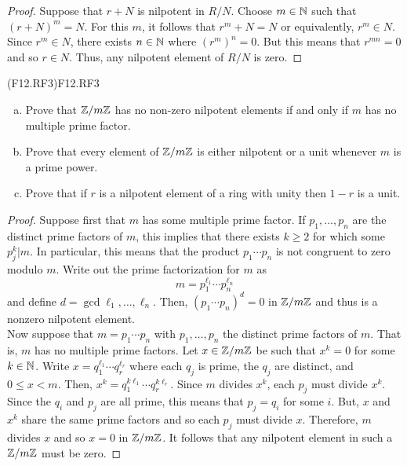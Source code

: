 \documentclass[../AlgebraQualSolutions.tex]{subfiles}
\begin{document}
\begin{proof}
	Suppose that $r + N$ is nilpotent in $R/N$. Choose $m \in \mathbb{N}$ such that $(r + N)^m = N$. For this $m$, it follows that $r^m + N = N$ or equivalently, $r^m \in N$. Since $r^m \in N$, there exists $n \in \mathbb{N}$ where $(r^m)^n = 0$. But this means that $r^{mn} = 0$ and so $r \in N$. Thus, any nilpotent element of $R/N$ is zero.
\end{proof}

\begin{prob}{(F12.RF3)}{F12.RF3}
\begin{enumerate}[(a)]
\item Prove that $\mathbb{Z}/m\mathbb{Z}$ has no non-zero nilpotent elements if and only if $m$ has no multiple prime factor.
\item Prove that every element of $\mathbb{Z}/m\mathbb{Z}$ is either nilpotent or a unit whenever $m$ is a prime power.
\item Prove that if $r$ is a nilpotent element of a ring with unity then $1-r$ is a unit.
\end{enumerate}
\end{prob}

\begin{proof}
    Suppose first that $m$ has some multiple prime factor. If $p_1,\ldots, p_n$ are the distinct prime factors of $m$, this implies that there exists $k \geq 2$ for which some $p_j^k | m$. In particular, this means that the product $p_1 \cdots p_n$ is not congruent to zero modulo $m$. Write out the prime factorization for $m$ as 
		\[m = p_1^{\ell_1} \cdots p_n^{\ell_n}\]
	and define $d = \gcd{\ell_1,\ldots, \ell_n}$. Then, $(p_1\cdots p_n)^d = 0$ in $\mathbb{Z}/m\mathbb{Z}$ and thus is a nonzero nilpotent element.\\

	Now suppose that $m = p_1 \cdots p_n$ with $p_1,\ldots, p_n$ the distinct prime factors of $m$. That is, $m$ has no multiple prime factors. Let $x \in \mathbb{Z}/m\mathbb{Z}$ be such that $x^k = 0$ for some $k \in \mathbb{N}$. Write $x = q_1^{\ell_1} \cdots q_r^{\ell_r}$ where each $q_j$ is prime, the $q_j$ are distinct, and $0 \leq x < m$. Then, $x^k = q_1^{k\ell_1} \cdots q_r^{k\ell_r}$. Since $m$ divides $x^k$, each $p_j$ must divide $x^k$. Since the $q_i$ and $p_j$ are all prime, this means that $p_j = q_i$ for some $i$. But, $x$ and $x^k$ share the same prime factors and so each $p_j$ must divide $x$. Therefore, $m$ divides $x$ and so $x = 0$ in $\mathbb{Z}/m\mathbb{Z}$. It follows that any nilpotent element in such a $\mathbb{Z}/m\mathbb{Z}$ must be zero.
\end{proof}
\end{document}
